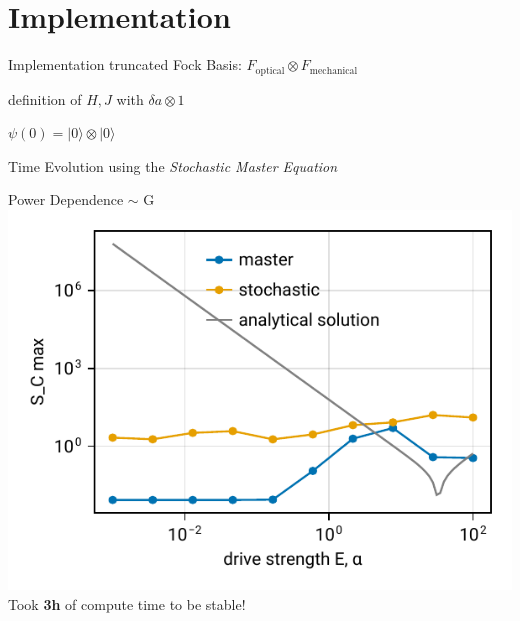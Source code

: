 \documentclass{beamer}
\begin{document}
\section{Implementation}
\begin{frame}{Implementation}
truncated Fock Basis: $F_\text{optical} \otimes F_\text{mechanical}$

definition of $H, J$ with $\delta a \otimes 1$

$\psi(0) = |0\rangle \otimes |0\rangle$

Time Evolution using the \emph{Stochastic Master Equation}
\end{frame}



\begin{frame}{Power Dependence $\sim$ G}
	\includegraphics{figures/02 power.pdf}
	\\\small
	Took \textbf{3h} of compute time to be stable!
\end{frame}
\end{document}
